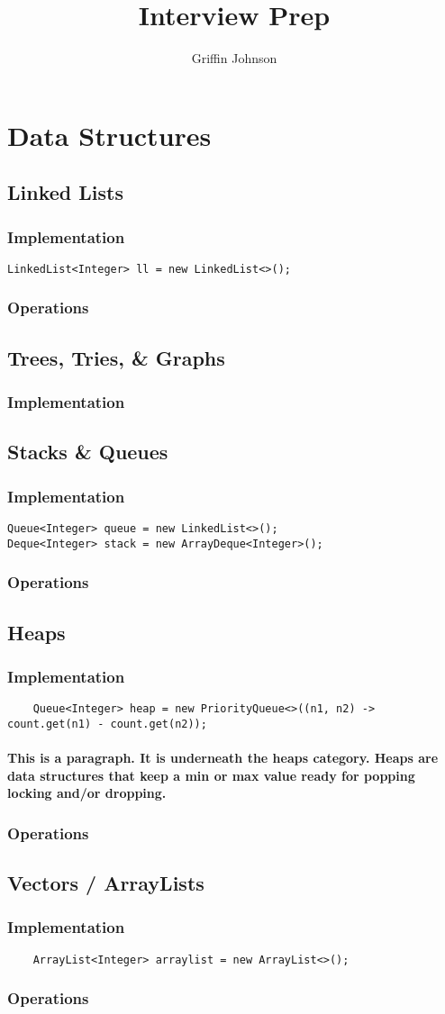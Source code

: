 \documentclass[]{article}
\title{Interview Prep}
\author{Griffin Johnson}
\newcommand{\impl}{\subsubsection{Implementation}}
\newcommand{\ops}{\subsubsection{Operations}}
\begin{document}
\maketitle

\section{Data Structures}

\subsection{Linked Lists}
\impl
\begin{verbatim}
LinkedList<Integer> ll = new LinkedList<>();
\end{verbatim}
\ops

\subsection{Trees, Tries, \& Graphs}
\impl


\subsection{Stacks \& Queues}
\impl
\begin{verbatim}
Queue<Integer> queue = new LinkedList<>();
Deque<Integer> stack = new ArrayDeque<Integer>();
\end{verbatim}
\ops

\subsection{Heaps}
\impl
\begin{verbatim}
	Queue<Integer> heap = new PriorityQueue<>((n1, n2) -> count.get(n1) - count.get(n2));
\end{verbatim}
\paragraph{
This is a paragraph. It is underneath the heaps category. Heaps are data structures that keep a min or max value ready for popping locking and/or dropping.
}
\ops

\subsection{Vectors / ArrayLists}
\impl
\begin{verbatim}
	ArrayList<Integer> arraylist = new ArrayList<>();
\end{verbatim}
\ops
\end{document}
